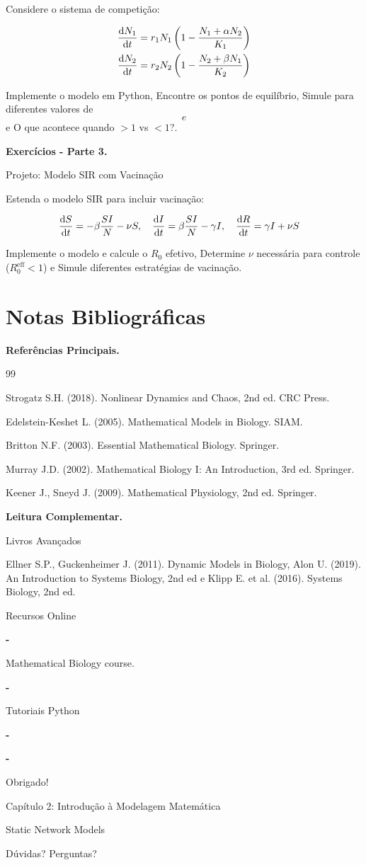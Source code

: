 Considere o sistema de competição:

%
\begin{align*}
\frac{\mathrm{d} N_1}{\mathrm{d} t} &= r_1 N_1 \left(1 - \frac{N_1 + \alpha N_2}{K_1}\right)\\
\frac{\mathrm{d} N_2}{\mathrm{d} t} &= r_2 N_2 \left(1 - \frac{N_2 + \beta N_1}{K_2}\right)
\end{align*}
%

Implemente o modelo em Python, Encontre os pontos de equilíbrio, Simule para diferentes valores de $$ e $$ e O que acontece quando $ > 1$ vs $ < 1$?.

\textbf{Exercícios - Parte 3.}

Projeto: Modelo SIR com Vacinação

Estenda o modelo SIR para incluir vacinação:

%
\begin{align*}
\frac{\mathrm{d} S}{\mathrm{d} t} &= -\beta \frac{SI}{N} - \nu S, \quad \frac{\mathrm{d} I}{\mathrm{d} t} = \beta \frac{SI}{N} - \gamma I, \quad \frac{\mathrm{d} R}{\mathrm{d} t} = \gamma I + \nu S
\end{align*}
%

Implemente o modelo e calcule o $R_0$ efetivo, Determine $\nu$ necessária para controle ($R_0^{\text{eff}} < 1$) e Simule diferentes estratégias de vacinação.

\section{Notas Bibliográficas}

\textbf{Referências Principais.}

99

 Strogatz S.H. (2018). Nonlinear Dynamics and Chaos, 2nd ed. CRC Press.

 Edelstein-Keshet L. (2005). Mathematical Models in Biology. SIAM.

 Britton N.F. (2003). Essential Mathematical Biology. Springer.

 Murray J.D. (2002). Mathematical Biology I: An Introduction, 3rd ed. Springer.

 Keener J., Sneyd J. (2009). Mathematical Physiology, 2nd ed. Springer.

\textbf{Leitura Complementar.}

Livros Avançados

Ellner S.P., Guckenheimer J. (2011). Dynamic Models in Biology, Alon U. (2019). An Introduction to Systems Biology, 2nd ed e Klipp E. et al. (2016). Systems Biology, 2nd ed.

Recursos Online

\textbf{-}

Mathematical Biology course.

\textbf{-}

Tutoriais Python

\textbf{-}

\textbf{-}

 Obrigado!

 Capítulo 2: Introdução à Modelagem Matemática

%

Static Network Models

Dúvidas? Perguntas?
